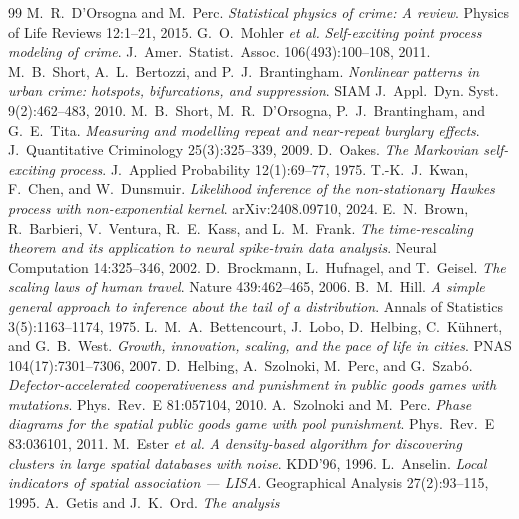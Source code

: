 \documentclass[11pt,a4paper]{article}
\newcommand{\1}{\mathbf{1}}
\theoremstyle{plain}
\theoremstyle{definition}
\begin{document}
\begin{thebibliography}{99}\small
{} M.~R.~D'Orsogna and M.~Perc.
  \emph{Statistical physics of crime: A review}.
  Physics of Life Reviews 12:1--21, 2015.
 G.~O.~Mohler \emph{et al.}
  \emph{Self-exciting point process modeling of crime}.
  J.~Amer.~Statist.~Assoc. 106(493):100--108, 2011.
 M.~B.~Short, A.~L.~Bertozzi, and
  P.~J.~Brantingham. \emph{Nonlinear patterns in urban crime:
  hotspots, bifurcations, and suppression}. SIAM J.~Appl.~Dyn.
  Syst. 9(2):462--483, 2010.
 M.~B.~Short, M.~R.~D'Orsogna,
  P.~J.~Brantingham, and G.~E.~Tita. \emph{Measuring and modelling
  repeat and near-repeat burglary effects}. J.~Quantitative
  Criminology 25(3):325--339, 2009.
 D.~Oakes. \emph{The Markovian
  self-exciting process}. J.~Applied Probability 12(1):69--77,
  1975.
 T.-K.~J.~Kwan, F.~Chen, and
  W.~Dunsmuir. \emph{Likelihood inference of the non-stationary
  Hawkes process with non-exponential kernel}. arXiv:2408.09710,
  2024.
 E.~N.~Brown, R.~Barbieri, V.~Ventura,
  R.~E.~Kass, and L.~M.~Frank. \emph{The time-rescaling theorem
  and its application to neural spike-train data analysis}.
  Neural Computation 14:325--346, 2002.
 D.~Brockmann, L.~Hufnagel, and
  T.~Geisel. \emph{The scaling laws of human travel}. Nature
  439:462--465, 2006.
 B.~M.~Hill. \emph{A simple general
  approach to inference about the tail of a distribution}.
  Annals of Statistics 3(5):1163--1174, 1975.
 L.~M.~A.~Bettencourt, J.~Lobo,
  D.~Helbing, C.~Kühnert, and G.~B.~West. \emph{Growth, innovation,
  scaling, and the pace of life in cities}. PNAS
  104(17):7301--7306, 2007.
 D.~Helbing, A.~Szolnoki, M.~Perc, and
  G.~Szabó. \emph{Defector-accelerated cooperativeness and
  punishment in public goods games with mutations}.
  Phys.~Rev.~E 81:057104, 2010.
 A.~Szolnoki and M.~Perc.
  \emph{Phase diagrams for the spatial public goods game with
  pool punishment}. Phys.~Rev.~E 83:036101, 2011.
 M.~Ester \emph{et al.}
  \emph{A density-based algorithm for discovering clusters in
  large spatial databases with noise}. KDD'96, 1996.
 L.~Anselin. \emph{Local indicators of
  spatial association --- LISA}. Geographical Analysis
  27(2):93--115, 1995.
 A.~Getis and J.~K.~Ord. \emph{The analysis
}
\end{thebibliography}
\end{document}
